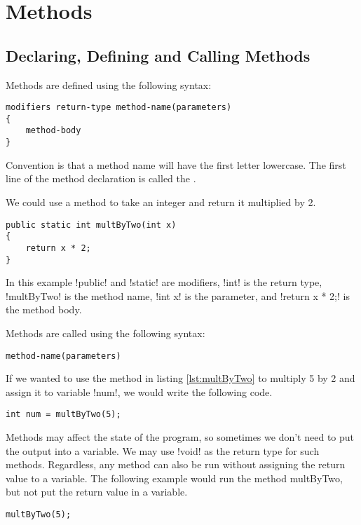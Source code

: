 \documentclass[11pt]{article}
\begin{document}
\section{Methods}
\label{sec:methods}
\subsection{Declaring, Defining and Calling Methods}
Methods are defined using the following syntax:
\vspace{-15pt}
\begin{lstlisting}[style=basic]
modifiers return-type method-name(parameters) 
{
    method-body
}
\end{lstlisting}
Convention is that a method name will have the first letter lowercase. The first line of the method declaration is called the .
\begin{eg} We could use a method to take an integer and return it multiplied by 2.
\begin{lstlisting}[caption=An example method, label=lst:multByTwo]
public static int multByTwo(int x)
{
    return x * 2;
}
\end{lstlisting}
In this example \inline!public! and \inline!static! are modifiers, \inline!int! is the return type, \inline!multByTwo! is the method name, \inline!int x! is the parameter, and \inline!return x * 2;! is the method body.
\end{eg}
\noindent Methods are called using the following syntax:
\vspace{-15pt}
\begin{lstlisting}[style=basic]
method-name(parameters) 
\end{lstlisting}
\begin{eg} If we wanted to use the method in listing \ref{lst:multByTwo} to multiply 5 by 2 and assign it to variable \inline!num!, we would write the following code.
\vspace{-15pt}
\begin{lstlisting}
int num = multByTwo(5);
\end{lstlisting}
Methods may affect the state of the program, so sometimes we don't need to put the output into a variable. We may use \inline!void! as the return type for such methods. Regardless, any method can also be run without assigning the return value to a variable. The following example would run the method multByTwo, but not put the return value in a variable.
\vspace{-15pt}
\begin{lstlisting}
multByTwo(5);
\end{lstlisting}
\end{eg}
\pagebreak
\end{document}
